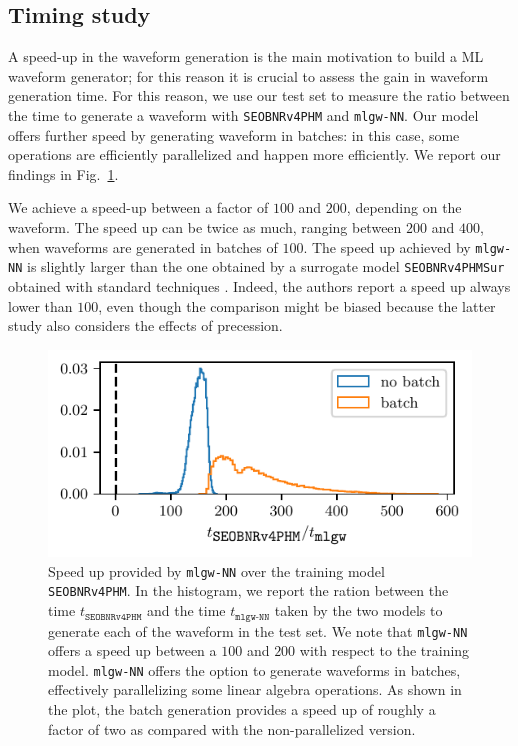 \documentclass[twocolumn,showpacs,preprintnumbers,nofootinbib,prd,
superscriptaddress,10pt]{revtex4-1}
\begin{document}
{\subsection{Timing study}
\label{sec:timing}

A speed-up in the waveform generation is the main motivation to build a ML waveform generator; for this reason it is crucial to assess the gain in waveform generation time.
For this reason, we use our test set to measure the ratio between the time to generate a waveform with \texttt{SEOBNRv4PHM} and \texttt{mlgw-NN}. Our model offers further speed by generating waveform in batches: in this case, some operations are efficiently parallelized and happen more efficiently.
We report our findings in Fig.~\ref{fig:timing_hist}.

We achieve a speed-up between a factor of $100$ and $200$, depending on the waveform.
The speed up can be twice as much, ranging between $200$ and $400$, when waveforms are generated in batches of $100$.
The speed up achieved by \texttt{mlgw-NN} is slightly larger than the one obtained by a 
surrogate model \texttt{SEOBNRv4PHMSur} obtained with standard techniques \cite{Gadre:2022sed}.
Indeed, the authors report a speed up always lower than $100$, even though the comparison might be biased because the latter study also considers the effects of precession.

\begin{figure}[t]
	\centering
	\includegraphics[scale = 1]{timing}
	\caption{Speed up provided by \texttt{mlgw-NN} over the training model \texttt{SEOBNRv4PHM}.
	In the histogram, we report the ration between the time $t_\texttt{SEOBNRv4PHM}$ and the time $t_\texttt{mlgw-NN}$ taken by the two models to generate each of the waveform in the test set.
	We note that \texttt{mlgw-NN} offers a speed up between a $100$ and $200$ with respect to the training model.
	\texttt{mlgw-NN} offers the option to generate waveforms in batches, effectively parallelizing some linear algebra operations. As shown in the plot, the batch generation provides a speed up of roughly a factor of two as compared with the non-parallelized version.
	}
	\label{fig:timing_hist}
\end{figure}

}
\end{document}

